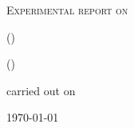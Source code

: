 
\makeatletter
\newcommand*{\protokollemailparse}[1]{%
	\@for\@tempa:=#1\do{%
		\normalsize\email{\@tempa}\\
	}%
}
\makeatother

\begin{titlepage}
	\centering
	{\scshape\LARGE Experimental report on \par}
	\vspace{1cm}
	{\scshape\huge \varName\par}
	\vspace{2.5cm}
	{\LARGE \varGruppe\par}
	\vspace{0.5cm}
	{\large \varNameA {} (\varEmailA) \par}
	{\large \varNameB {} (\varEmailB) \par}
	\vfill
	carried out on \varDatum\par
	{\large \varBetreuer}
	\vfill
	{\large \today\par}
\end{titlepage}


\maketitle
